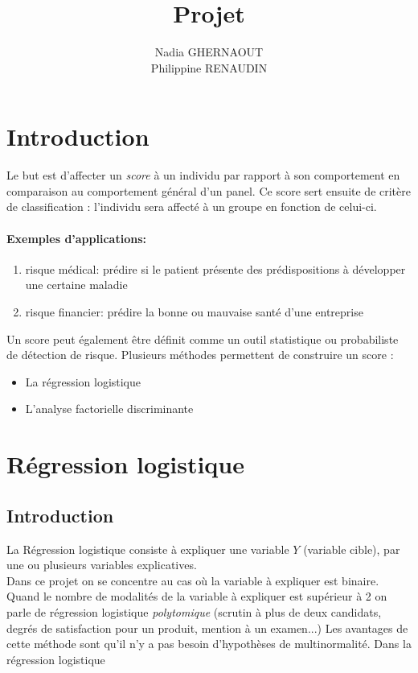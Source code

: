 \documentclass[11pt, oneside]{article}   	%
\title{Projet}
\author{Nadia GHERNAOUT \\ Philippine RENAUDIN}
\date{}							%
\begin{document}
\maketitle
\section{Introduction}


Le but est d'affecter un \textit{score} à un individu par rapport à son comportement en comparaison au comportement général d'un panel. Ce score sert ensuite de critère de classification : l'individu sera affecté à un groupe en fonction de celui-ci. 
\paragraph{Exemples d'applications:}
\begin{enumerate}
\item risque médical: prédire si le patient présente des prédispositions à développer une certaine maladie
\item risque financier: prédire la bonne ou mauvaise santé d'une entreprise 
\end{enumerate}
Un score peut également être définit comme un outil statistique ou probabiliste de détection de risque. 
Plusieurs méthodes permettent de construire un score :
\begin{itemize}
\item La régression logistique
\item L'analyse factorielle discriminante 
\end{itemize}

\section{Régression logistique}
\subsection{Introduction}
La Régression logistique consiste à expliquer une variable $Y$ (variable cible), par une ou plusieurs variables explicatives.  \\


Dans ce projet on se concentre au cas où la variable à expliquer est binaire. \\
Quand le nombre de modalités de la variable à expliquer est supérieur à 2 on parle de régression logistique \textit{polytomique} (scrutin à plus de deux candidats, degrés de satisfaction pour un produit, mention à un examen...) 
Les avantages de cette méthode sont qu'il n'y a pas besoin d'hypothèses de multinormalité.
Dans la régression logistique 
\end{document}
